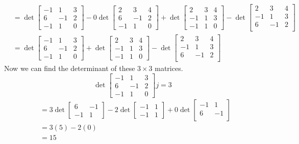 \documentclass{report}
\begin{document}
$$
\begin{aligned}
& = \operatorname{det}
\begin{bmatrix}
-1&1&3\\
6&-1&2\\
-1&1&0 
\end{bmatrix} - 0\operatorname{det}
\begin{bmatrix}
2&3&4\\
6&-1&2\\
-1&1&0 
\end{bmatrix} + \operatorname{det}
\begin{bmatrix}
2&3&4\\
-1&1&3\\
-1&1&0 
\end{bmatrix} - \operatorname{det}
\begin{bmatrix}
2&3&4\\
-1&1&3\\
6&-1&2\\
\end{bmatrix} \\
& = \operatorname{det}
\begin{bmatrix}
-1&1&3\\
6&-1&2\\
-1&1&0 
\end{bmatrix} + \operatorname{det}
\begin{bmatrix}
2&3&4\\
-1&1&3\\
-1&1&0 
\end{bmatrix} - \operatorname{det}
\begin{bmatrix}
2&3&4\\
-1&1&3\\
6&-1&2\\
\end{bmatrix} 
\end{aligned}
$$
Now we can find the determinant of these $3\times3$ matrices.
$$
\operatorname{det}
\begin{bmatrix}
-1&1&3\\
6&-1&2\\
-1&1&0 
\end{bmatrix} j = 3
$$
$$
\begin{aligned}
& = 3\operatorname{det}
\begin{bmatrix}
6&-1\\
-1&1 
\end{bmatrix} - 2\operatorname{det}
\begin{bmatrix}
-1&1\\
-1&1 
\end{bmatrix} + 0\operatorname{det}
\begin{bmatrix}
-1&1\\
6&-1\\
\end{bmatrix} \\
& = 3(5) - 2(0) \\
& = 15
\end{aligned}
$$
\end{document}
